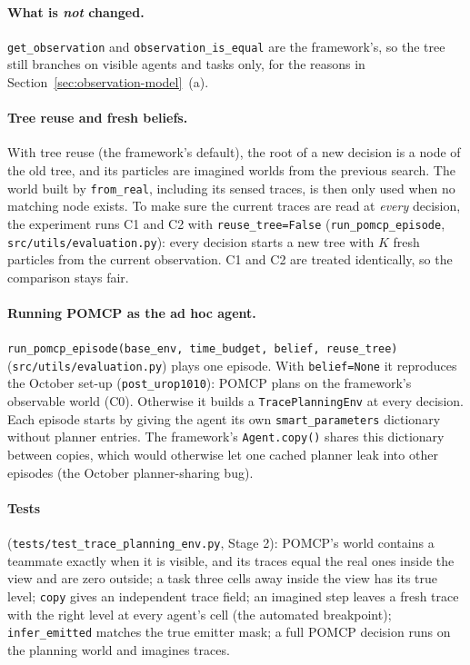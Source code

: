 \documentclass[11pt,a4paper]{article}
\newcommand{\file}{\nolinkurl}  %
\newcommand{\code}[1]{\texttt{#1}}
\theoremstyle{remark}
\begin{document}
\paragraph{What is \emph{not} changed.} \code{get\_observation} and \code{observation\_is\_equal} are the framework's, so
the tree still branches on visible agents and tasks only, for the reasons in Section~\ref{sec:observation-model}~(a).

\paragraph{Tree reuse and fresh beliefs.} With tree reuse (the framework's default), the root of a new decision is a node
of the old tree, and its particles are imagined worlds from the previous search. The world built by \code{from\_real},
including its sensed traces, is then only used when no matching node exists. To make sure the current traces are read at
\emph{every} decision, the experiment runs C1 and C2 with \code{reuse\_tree=False}
(\code{run\_pomcp\_episode}, \file{src/utils/evaluation.py}): every decision starts a new tree with $K$ fresh particles
from the current observation. C1 and C2 are treated identically, so the comparison stays fair.

\paragraph{Running POMCP as the ad hoc agent.} \code{run\_pomcp\_episode(base\_env, time\_budget, belief, reuse\_tree)}
(\file{src/utils/evaluation.py}) plays one episode. With \code{belief=None} it reproduces the October set-up
(\code{post\_urop1010}): POMCP plans on the framework's observable world (C0). Otherwise it builds a
\code{TracePlanningEnv} at every decision. Each episode starts by giving the agent its own \code{smart\_parameters}
dictionary without planner entries. The framework's \code{Agent.copy()} shares this dictionary between copies, which
would otherwise let one cached planner leak into other episodes (the October planner-sharing bug).

\paragraph{Tests} (\file{tests/test_trace_planning_env.py}, Stage 2): POMCP's world contains a teammate exactly when it is
visible, and its traces equal the real ones inside the view and are zero outside; a task three cells away inside the view
has its true level; \code{copy} gives an independent trace field; an imagined step leaves a fresh trace with the right
level at every agent's cell (the automated breakpoint); \code{infer\_emitted} matches the true emitter mask; a full POMCP
decision runs on the planning world and imagines traces.
\end{document}
